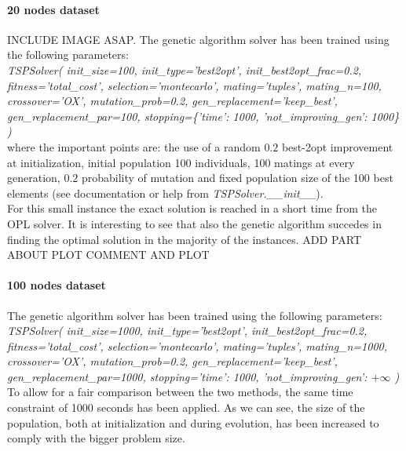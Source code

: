 \documentclass{article}
\begin{document}
\paragraph*{20 nodes dataset}
INCLUDE IMAGE ASAP.
The genetic algorithm solver has been trained using the following parameters: \\
\newline
\textit{TSPSolver(
        init\_size=100, init\_type='best2opt', init\_best2opt\_frac=0.2, fitness='total\_cost',
        selection='montecarlo', mating='tuples', mating\_n=100, crossover='OX', mutation\_prob=0.2,
        gen\_replacement='keep\_best', gen\_replacement\_par=100,
        stopping=\{'time': 1000, 'not\_improving\_gen': 1000\}
    )} \\
\newline
where the important points are: the use of a random $0.2$ best-2opt improvement at initialization, initial population 100 individuals, 100 matings at every generation, $0.2$ probability of mutation and fixed population size of the 100 best elements (see documentation or help from \textit{TSPSolver.\_\_init\_\_}). \\
For this small instance the exact solution is reached in a short time from the OPL solver. It is interesting to see that also the genetic algorithm succedes in finding the optimal solution in the majority of the instances. 
ADD PART ABOUT PLOT COMMENT AND PLOT

\paragraph*{100 nodes dataset}
The genetic algorithm solver has been trained using the following parameters: \\
\newline
\textit{TSPSolver(
        init\_size=1000, init\_type='best2opt', init\_best2opt\_frac=0.2, fitness='total\_cost',
        selection='montecarlo', mating='tuples', mating\_n=1000, crossover='OX', mutation\_prob=0.2,
        gen\_replacement='keep\_best', gen\_replacement\_par=1000,
        stopping={'time': 1000, 'not\_improving\_gen': $+\infty$}
    )} \\
\newline
To allow for a fair comparison between the two methods, the same time constraint of 1000 seconds has been applied. As we can see, the size of the population, both at initialization and during evolution, has been increased to comply with the bigger problem size.
\end{document}
